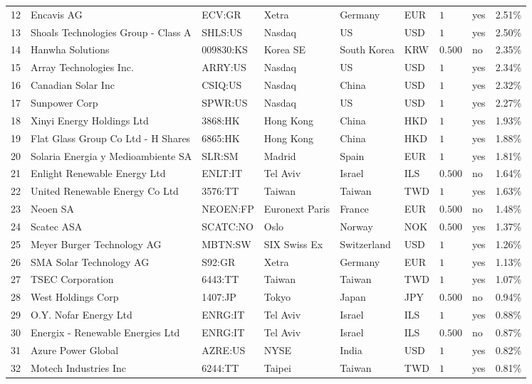 \documentclass[11pt]{article}
\begin{document}
\begin{appendices}
\begin{landscape}
\begin{longtable}{ *{9}{l} }
12 & Encavis AG & ECV:GR & Xetra & Germany & EUR & $1$ & yes & 2.51\% \\ 
13 & Shoals Technologies Group - Class A & SHLS:US & Nasdaq & US & USD & $1$ & yes & 2.50\% \\ 
14 & Hanwha Solutions & 009830:KS & Korea SE & South Korea & KRW & $0.500$ & no & 2.35\% \\ 
15 & Array Technologies Inc. & ARRY:US & Nasdaq & US & USD & $1$ & yes & 2.34\% \\ 
16 & Canadian Solar Inc & CSIQ:US & Nasdaq & China & USD & $1$ & yes & 2.32\% \\ 
17 & Sunpower Corp & SPWR:US & Nasdaq & US & USD & $1$ & yes & 2.27\% \\ 
18 & Xinyi Energy Holdings Ltd & 3868:HK & Hong Kong & China & HKD & $1$ & yes & 1.93\% \\ 
19 & Flat Glass Group Co Ltd - H Shares & 6865:HK & Hong Kong & China & HKD & $1$ & yes & 1.88\% \\ 
20 & Solaria Energia y Medioambiente SA & SLR:SM & Madrid & Spain & EUR & $1$ & yes & 1.81\% \\ 
21 & Enlight Renewable Energy Ltd & ENLT:IT & Tel Aviv & Israel & ILS & $0.500$ & no & 1.64\% \\ 
22 & United Renewable Energy Co Ltd & 3576:TT & Taiwan & Taiwan & TWD & $1$ & yes & 1.63\% \\ 
23 & Neoen SA & NEOEN:FP & Euronext Paris & France & EUR & $0.500$ & no & 1.48\% \\ 
24 & Scatec ASA & SCATC:NO & Oslo & Norway & NOK & $0.500$ & yes & 1.37\% \\ 
25 & Meyer Burger Technology AG & MBTN:SW & SIX Swiss Ex & Switzerland & USD & $1$ & yes & 1.26\% \\ 
26 & SMA Solar Technology AG & S92:GR & Xetra & Germany & EUR & $1$ & yes & 1.13\% \\ 
27 & TSEC Corporation & 6443:TT & Taiwan & Taiwan & TWD & $1$ & yes & 1.07\% \\ 
28 & West Holdings Corp & 1407:JP & Tokyo & Japan & JPY & $0.500$ & no & 0.94\% \\ 
29 & O.Y. Nofar Energy Ltd & ENRG:IT & Tel Aviv & Israel & ILS & $1$ & yes & 0.88\% \\ 
30 & Energix - Renewable Energies Ltd & ENRG:IT & Tel Aviv & Israel & ILS & $0.500$ & no & 0.87\% \\ 
31 & Azure Power Global & AZRE:US & NYSE & India & USD & $1$ & yes & 0.82\% \\ 
32 & Motech Industries Inc & 6244:TT & Taipei & Taiwan & TWD & $1$ & yes & 0.81\% \\ 

\end{longtable}
\end{landscape}
\end{appendices}
\end{document}
